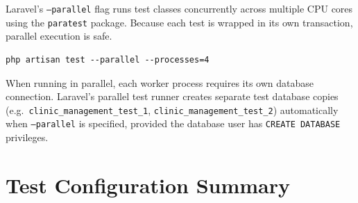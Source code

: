 Laravel's \texttt{--parallel} flag runs test classes concurrently across
multiple CPU cores using the \texttt{paratest} package. Because each
test is wrapped in its own transaction, parallel execution is safe.

\begin{lstlisting}[style=bash, caption={Run tests in parallel across 4 workers.}]
php artisan test --parallel --processes=4
\end{lstlisting}

\begin{warningbox}
  When running in parallel, each worker process requires its own
  database connection. Laravel's parallel test runner creates separate
  test database copies (e.g.\ \texttt{clinic\_management\_test\_1},
  \texttt{clinic\_management\_test\_2}) automatically when
  \texttt{--parallel} is specified, provided the database user has
  \texttt{CREATE DATABASE} privileges.
\end{warningbox}

\section{Test Configuration Summary}
\label{sec:test-config-summary}

